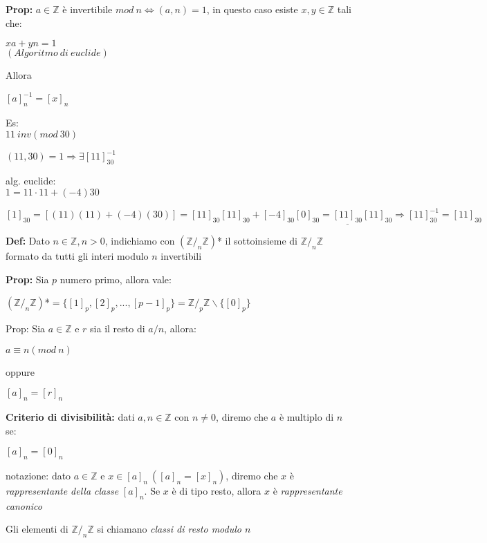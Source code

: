 \documentclass[11pt, letterpaper]{article}
\begin{document}
\textbf{Prop:} $a\in\mathbb{Z}$ è invertibile $mod\ n\Leftrightarrow(a,n)=1$, in questo caso esiste $x,y\in\mathbb{Z}$
tali che:
\begin{center}
    $xa+yn=1$\\
    $(Algoritmo\ di\ euclide)$
\end{center}
Allora
\begin{center}
    $[a]_{n}^{-1}=[x]_{n}$
\end{center}

Es:\\
$11\ inv(mod\ 30)$

$(11,30) = 1 \Rightarrow \exists[11]_{30}^{-1}$

alg. euclide:\\
$1= 11\cdot 11 + (-4)30$

$[1]_{30}=[(11)(11)+(-4)(30)]=[11]_{30}[11]_{30}+[-4]_{30}[0]_{30}=\underline{[11]_{30}}[11]_{30} \Rightarrow 
[11]_{30}^{-1}=[11]_{30}$

\textbf{Def:} Dato $n\in\mathbb{Z}, n>0$, indichiamo con $(\mathbb{Z}/_{n}\mathbb{Z})$* il sottoinsieme di 
$\mathbb{Z}/_{n}\mathbb{Z}$ formato da tutti gli interi modulo $n$ invertibili

\textbf{Prop:} Sia $p$ numero primo, allora vale:
\begin{center}
    $(\mathbb{Z}/_{n}\mathbb{Z})$*$=\{[1]_{p},[2]_{p},...,[p-1]_{p}\}=\mathbb{Z}/_{p}\mathbb{Z}\backslash \{[0]_{p}\}$
\end{center}

\newpage
Prop: Sia $a\in\mathbb{Z}$ e $r$ sia il resto di $a/n$, allora:
\begin{center}
    $a\equiv n(mod\ n)$

    oppure

    $[a]_n=[r]_{n}$
\end{center}

\textbf{Criterio di divisibilità:} dati $a,n\in\mathbb{Z}$ con $n\neq 0$, diremo che $a$ è multiplo di
$n$ se:
\begin{center}
    $[a]_{n}=[0]_{n}$
\end{center}

notazione: dato $a\in\mathbb{Z}$ e $x\in [a]_{n}\ ([a]_{n}=[x]_{n})$, diremo che $x$ è \textit{rappresentante
della classe} $[a]_{n}$. Se $x$ è di tipo resto, allora $x$ è \textit{rappresentante canonico}

Gli elementi di $\mathbb{Z}/_{n}\mathbb{Z}$ si chiamano \textit{classi di resto modulo $n$}
\end{document}

